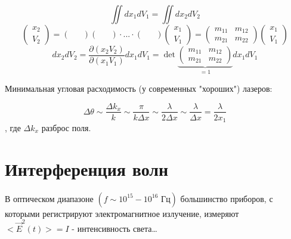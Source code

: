 \documentclass[12pt, a4paper]{report}
\begin{document}
\begin{theorem}
    \[ \iint d x_1 d V_1 = \iint d x_2 d V_2  \] 
    \[\begin{pmatrix}
    x_2\\
    V_2
    \end{pmatrix} = \begin{pmatrix}
    &\\
    &
    \end{pmatrix} 
    \begin{pmatrix}
        &\\
        &
    \end{pmatrix} \cdot ... \cdot 
    \begin{pmatrix}
        &\\
        &
    \end{pmatrix}
    \begin{pmatrix}
        x_1\\
        V_1
    \end{pmatrix} =\begin{pmatrix}
    m_{11}  & m_{12}\\
    m_{21}& m_{22} 
    \end{pmatrix} 
    \begin{pmatrix}
        x_1\\
        V_1
    \end{pmatrix}    \] 
    \[ d x_2 d V_2  = \frac{\partial  (x_2 V_2 )}{\partial (x_1  V_1 )} d x_1 d V_1 = \det \underbrace{\begin{pmatrix}
        m_{11}  & m_{12}\\
        m_{21}& m_{22}
    \end{pmatrix} }_{= 1} d x_1 d V_1 \] 
\end{theorem} 

Минимальная угловая расходимость (у современных "хороших") лазеров: 

\[ \Delta \theta \sim \frac{\Delta k_x}{k } \sim  \frac{\pi}{k \Delta x } \sim  \frac{ \lambda }{2 \Delta x } \sim \frac{\lambda }{\Delta x } = \frac{\lambda }{2 x_1 }      \] 
, где \( \Delta k_x \)  разброс поля.

\chapter{Интерференция волн}

В оптическом диапазоне \( (f \sim  10 ^{15 }  - 10 ^{16 } \text{ Гц} ) \) большинство приборов, с которыми регистрируют электромагнитное излучение, измеряют \( <\vec{E } ^2 (t)> = I \) - интенсивность света\dots
\end{document}
